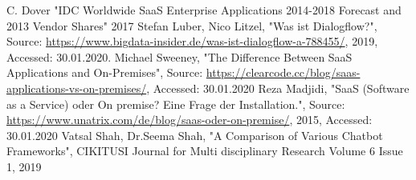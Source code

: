 \documentclass[10pt,final,journal,a4paper,oneside,twocolumn]{IEEEtran}
\begin{document}
\begin{thebibliography}{00}
 C. Dover "IDC Worldwide SaaS Enterprise Applications 2014-2018 Forecast and 2013 Vendor Shares" 2017
 Stefan Luber, Nico Litzel, "Was ist Dialogflow?", Source: \href{https://www.bigdata-insider.de/was-ist-dialogflow-a-788455/}{https://www.bigdata-insider.de/was-ist-dialogflow-a-788455/}, 2019, Accessed: 30.01.2020.
 Michael Sweeney, "The Difference Between SaaS Applications and On-Premises", Source: \href{https://clearcode.cc/blog/saas-applications-vs-on-premises/}{https://clearcode.cc/blog/saas-applications-vs-on-premises/}, Accessed: 30.01.2020
 Reza Madjidi, "SaaS (Software as a Service) oder On premise? Eine Frage der Installation.", Source: \href{https://www.unatrix.com/de/blog/saas-oder-on-premise/}{https://www.unatrix.com/de/blog/saas-oder-on-premise/}, 2015, Accessed: 30.01.2020
 Vatsal Shah, Dr.Seema Shah, "A Comparison of Various Chatbot Frameworks", CIKITUSI Journal for Multi disciplinary Research Volume 6 Issue 1, 2019
\end{thebibliography}
\end{document}

